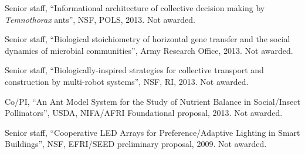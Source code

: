 \begin{bibenum}

    \item Senior staff, ``Informational architecture of collective
        decision making by \emph{Temnothorax} ants'', NSF, POLS, 2013.
        Not awarded.

    \item Senior staff,
        ``Biological stoichiometry of horizontal gene transfer and the
        social dynamics of microbial communities'', Army Research
        Office, 2013. Not awarded.

    \item Senior staff,
        ``Biologically-inspired strategies for collective transport and
        construction by multi-robot systems'', NSF, RI, 2013. Not
        awarded.

    \item Co\-/PI,
        ``An Ant Model System for the Study of Nutrient Balance in
        Social\-/Insect Pollinators'', USDA,
        NIFA\-/AFRI Foundational proposal, 2013. Not awarded.

    \item Senior staff,
        ``Cooperative LED Arrays for Preference\-/Adaptive Lighting in
        Smart Buildings'',
        NSF,
        EFRI\-/SEED preliminary proposal, 2009. Not awarded.

\end{bibenum}